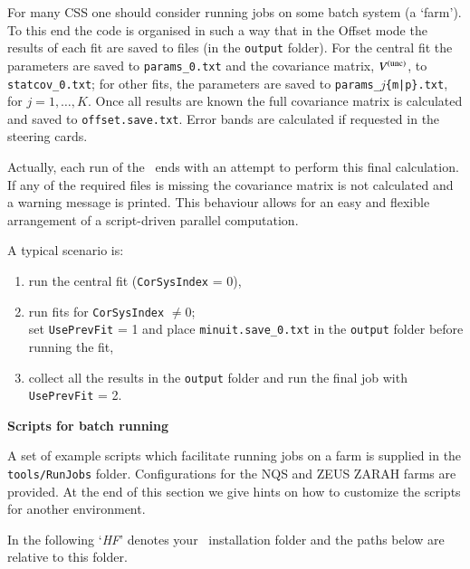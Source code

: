 For many CSS one should consider running jobs on some batch system (a `farm').
To this end the code is organised in such a way that in the Offset mode the results of each fit are saved to files
(in the \verb'output' folder). For the central fit the parameters are saved to
\verb'params_0.txt'
and the covariance matrix, $\Vstat$, to \verb'statcov_0.txt';
for other fits, the parameters are saved to
\verb'params_'$j$\verb'{m|p}.txt', for $j = 1,\dots,K$.
Once all results are known the full covariance matrix 
is calculated and saved to \verb'offset.save.txt'.
Error bands are calculated if requested in the steering cards.

Actually, each run of the \fitter\ ends with an attempt to perform this final calculation.
If any of the required files is missing the covariance matrix is not calculated
and a warning message is printed.
This behaviour allows for an easy and flexible arrangement of a script-driven parallel computation.

A typical scenario is:
\begin{enumerate}
\item
run the central fit (\verb'CorSysIndex' = 0),
\item
run fits for \verb'CorSysIndex' $\neq 0$;\\
set \verb'UsePrevFit' = 1
and place \verb'minuit.save_0.txt' in the \verb'output' folder before running the fit,
\item
collect all the results in the \verb'output' folder and run the final job with
\verb'UsePrevFit' = 2.
\end{enumerate}

\goodbreak
{\bf {Scripts for batch running}}

A set of example scripts
which facilitate running jobs on a farm is supplied in the \verb'tools/RunJobs' folder.
Configurations for the NQS and ZEUS ZARAH farms are provided.
At the end of this section we give hints on how to customize the scripts for another environment.

\newcommand\HF{\textit{HF}}
In the following
`\HF' denotes your \fitter\ installation folder
and the paths below are relative to this folder.

